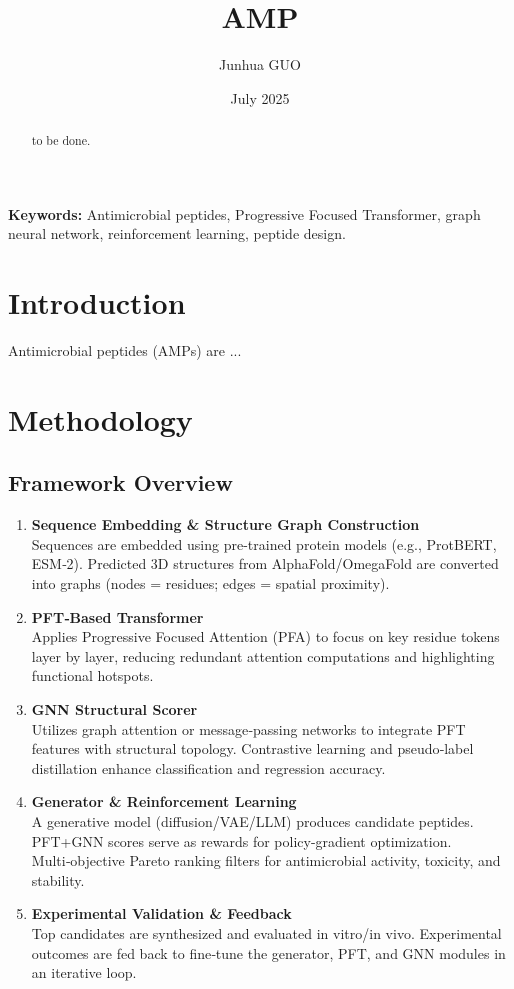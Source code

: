 \documentclass{article}
\title{AMP}
\author{Junhua GUO}
\date{July 2025}
\newenvironment{keywords}{\noindent\textbf{Keywords:} }{}
\begin{document}
\maketitle

\begin{abstract}
    to be done.
\end{abstract}

\begin{keywords}
Antimicrobial peptides, Progressive Focused Transformer, graph neural network, reinforcement learning, peptide design.
\end{keywords}

\section{Introduction}
Antimicrobial peptides (AMPs) are ...

\section{Methodology}
\subsection{Framework Overview}

\begin{enumerate}
  \item \textbf{Sequence Embedding \& Structure Graph Construction}\\
    Sequences are embedded using pre-trained protein models (e.g., ProtBERT, ESM‑2). Predicted 3D structures from AlphaFold/OmegaFold are converted into graphs (nodes = residues; edges = spatial proximity).
  \item \textbf{PFT‑Based Transformer}\\
    Applies Progressive Focused Attention (PFA) to focus on key residue tokens layer by layer, reducing redundant attention computations and highlighting functional hotspots.
  \item \textbf{GNN Structural Scorer}\\
    Utilizes graph attention or message‑passing networks to integrate PFT features with structural topology. Contrastive learning and pseudo‑label distillation enhance classification and regression accuracy.
  \item \textbf{Generator \& Reinforcement Learning}\\
    A generative model (diffusion/VAE/LLM) produces candidate peptides. PFT+GNN scores serve as rewards for policy-gradient optimization. Multi‑objective Pareto ranking filters for antimicrobial activity, toxicity, and stability.
  \item \textbf{Experimental Validation \& Feedback}\\
    Top candidates are synthesized and evaluated in vitro/in vivo. Experimental outcomes are fed back to fine‑tune the generator, PFT, and GNN modules in an iterative loop.
\end{enumerate}
\end{document}
